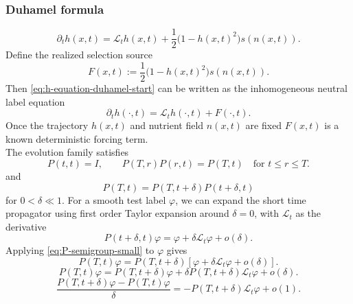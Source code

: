 \documentclass[11pt,a4paper]{report}
\begin{document}
	\subsubsection{Duhamel formula}
	\begin{equation}
		\partial_t h(x,t)
		=
		\mathcal L_t h(x,t)
		+
		\frac12\bigl(1-h(x,t)^2\bigr)s(n(x,t)).
		\label{eq:h-equation-duhamel-start}
	\end{equation}
	Define the realized selection source
	\begin{equation}
		F(x,t)
		:=
		\frac12\bigl(1-h(x,t)^2\bigr)s(n(x,t)).
		\label{eq:source-F}
	\end{equation}
	Then \eqref{eq:h-equation-duhamel-start} can be written as the inhomogeneous
	neutral label equation
	\begin{equation}
		\partial_t h(\cdot,t)
		=
		\mathcal L_t h(\cdot,t)+F(\cdot,t).
		\label{eq:inhomogeneous-linear-form}
	\end{equation}
	Once the trajectory \(h(x,t)\) and nutrient field \(n(x,t)\) are fixed
	\(F(x,t)\) is a known deterministic forcing term.\\
	The evolution family satisfies
	\begin{equation}
		P(t,t)=I,
		\qquad
		P(T,r)P(r,t)=P(T,t)
		\quad\text{for }t\le r\le T .
		\label{eq:evolution-family-duhamel}
	\end{equation}
	and
	\begin{equation}
		P(T,t)=P(T,t+\delta)P(t+\delta,t)
		\label{eq:P-semigroup-small}
	\end{equation}
	for $0<\delta\ll1$. For a smooth test label $\varphi$, we can expand the short time propagator using first order Taylor expansion around $\delta=0$, with $\mathcal L_t$ as the derivative
	\begin{equation}
		P(t+\delta,t)\varphi
		=
		\varphi+\delta\mathcal L_t\varphi+o(\delta).
		\label{eq:short-time-propagator}
	\end{equation}
	Applying \eqref{eq:P-semigroup-small} to $\varphi$ gives
	\begin{equation}
		P(T,t)\varphi
		=
		P(T,t+\delta)
		\left[
		\varphi+\delta\mathcal L_t\varphi+o(\delta)
		\right].
	\end{equation}
	\begin{equation}
		P(T,t)\varphi
		=
		P(T,t+\delta)\varphi
		+
		\delta P(T,t+\delta)\mathcal L_t\varphi
		+
		o(\delta).
	\end{equation}
	\begin{equation}
		\frac{P(T,t+\delta)\varphi-P(T,t)\varphi}{\delta}
		=
		-P(T,t+\delta)\mathcal L_t\varphi
		+
		o(1).
	\end{equation}
\end{document}
